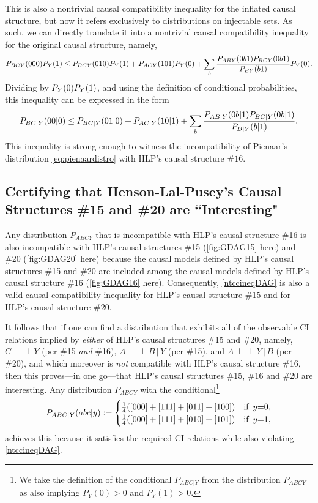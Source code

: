 \documentclass[aps,english,10pt,superscriptaddress,onecolumn,twoside,longbibliography,pra,floatfix,fleqn,nofootinbib]{revtex4-1}
\theoremstyle{definition}
\newcommand{\p}[2][]{{P_{#1}}\parenths{#2}}
\newcommand{\indep}{\perp\!\!\!\!\perp}
\newcommand{\eql}{\mathord{=}}
\DeclarePairedDelimiter{\parenths}{\lparen}{\rparen}
\begin{document}
This is also a nontrivial causal compatibility inequality for the inflated causal structure, but now it refers exclusively to distributions on injectable sets.  As such, we can directly translate it into a nontrivial causal compatibility inequality for the original causal structure, namely, 
\begin{align}\label{ntccineqinflationDAG3}
    \p[B C Y ]{000}\p[Y  ]{1} \leq \p[B  C Y]{010} \p[ Y ]{1} + \p[A C Y ]{10 1}\p[Y]{0}+\sum_{b} \frac{P_{A B Y}(0 b 1) P_{ B C Y}(0 b 1) }{P_{B Y}(b 1)} \p[ Y]{0}.
\end{align}
Dividing by $\p[Y  ]{0}\p[Y  ]{1}$, and using the definition of conditional probabilities, 
this inequality can be expressed in the form
\begin{align}\label{ntccineqDAG}
    \p[B C |Y ]{00|0} \leq \p[B  C| Y]{01|0} + \p[A C |Y ]{10 |1}+\sum_{b} \frac{P_{A B| Y}(0 b |1) P_{ B C |Y}(0 b |1) }{P_{B |Y}(b| 1)} .
\end{align}
This inequality is strong enough to witness the incompatibility of Pienaar's distribution \cref{eq:pienaardistro} with HLP's causal structure $\#16$.

\subsection{Certifying that Henson-Lal-Pusey's Causal Structures \#15 and \#20 are ``Interesting"} 

Any distribution $P_{ABCY}$ that is incompatible with HLP's causal structure \#16 is also incompatible with HLP's causal structures \#15 (\cref{fig:GDAG15} here) and \#20 (\cref{fig:GDAG20} here) because the causal models defined by HLP's causal structures \#15 and \#20 are included among the causal models defined by HLP's causal structure \#16 (\cref{fig:GDAG16} here).  Consequently, \cref{ntccineqDAG} is also a valid causal compatibility inequality for HLP's causal structure \#15 and for HLP's causal structure \#20.

It follows that if one can find a distribution that exhibits all of the observable CI relations implied by \emph{either} of HLP's causal structures \#15 and \#20, namely, $C\indep Y$ (per \#15 \emph{and} \#16), $A\indep B\,|\,Y$ (per \#15), and $A\indep Y\,|\,B$ (per \#20), and which moreover is \emph{not} compatible with HLP's causal structure \#16, then this proves---in one go---that HLP's causal structures \#15, \#16 and \#20 are interesting. Any distribution $P_{ABCY}$ with the conditional\footnote{We take the definition of the conditional $P_{A B C|Y}$ from the distribution $P_{ABCY}$ as also implying $P_Y(0) > 0$ and $P_Y(1) > 0$.}
\begin{align}\label{eq:allcirespectingdistro}
  P_{A B C|Y}(a b c| y):=
  \begin{cases}\frac{1}{4}\parenths{[000]+[111]+[011]+[100]}&\text{if }\,  y\eql 0, \\ \frac{1}{4}\parenths{[000]+[111]+[010]+[101]}&\text{if }\,  y\eql 1,\end{cases}
\end{align}
achieves this because it satisfies the required CI relations while also violating \cref{ntccineqDAG}.
\end{document}
